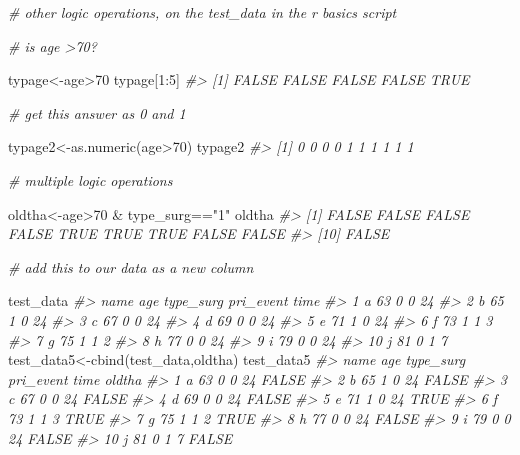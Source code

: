 \documentclass[
]{article}
\newenvironment{Shaded}{\begin{snugshade}}{\end{snugshade}}
\newcommand{\CommentTok}[1]{\textcolor[rgb]{0.56,0.35,0.01}{\textit{#1}}}
\newcommand{\DecValTok}[1]{\textcolor[rgb]{0.00,0.00,0.81}{#1}}
\newcommand{\FunctionTok}[1]{\textcolor[rgb]{0.00,0.00,0.00}{#1}}
\newcommand{\NormalTok}[1]{#1}
\newcommand{\OtherTok}[1]{\textcolor[rgb]{0.56,0.35,0.01}{#1}}
\newcommand{\SpecialCharTok}[1]{\textcolor[rgb]{0.00,0.00,0.00}{#1}}
\newcommand{\StringTok}[1]{\textcolor[rgb]{0.31,0.60,0.02}{#1}}
\begin{document}
\begin{Shaded}
\begin{Highlighting}[]
\CommentTok{\# other logic operations, on the test\_data in the r basics script}

\CommentTok{\# is age \textgreater{}70?}

\NormalTok{typage}\OtherTok{\textless{}{-}}\NormalTok{age}\SpecialCharTok{\textgreater{}}\DecValTok{70}
\NormalTok{typage[}\DecValTok{1}\SpecialCharTok{:}\DecValTok{5}\NormalTok{]}
\CommentTok{\#\textgreater{} [1] FALSE FALSE FALSE FALSE  TRUE}

\CommentTok{\# get this answer as 0 and 1}

\NormalTok{typage2}\OtherTok{\textless{}{-}}\FunctionTok{as.numeric}\NormalTok{(age}\SpecialCharTok{\textgreater{}}\DecValTok{70}\NormalTok{)}
\NormalTok{typage2  }
\CommentTok{\#\textgreater{}  [1] 0 0 0 0 1 1 1 1 1 1}

\CommentTok{\# multiple logic operations}

\NormalTok{oldtha}\OtherTok{\textless{}{-}}\NormalTok{age}\SpecialCharTok{\textgreater{}}\DecValTok{70} \SpecialCharTok{\&}\NormalTok{ type\_surg}\SpecialCharTok{==}\StringTok{"1"}
\NormalTok{oldtha}
\CommentTok{\#\textgreater{}  [1] FALSE FALSE FALSE FALSE  TRUE  TRUE  TRUE FALSE FALSE}
\CommentTok{\#\textgreater{} [10] FALSE}

\CommentTok{\# add this to our data as a new column}

\NormalTok{test\_data}
\CommentTok{\#\textgreater{}    name age type\_surg pri\_event time}
\CommentTok{\#\textgreater{} 1     a  63         0         0   24}
\CommentTok{\#\textgreater{} 2     b  65         1         0   24}
\CommentTok{\#\textgreater{} 3     c  67         0         0   24}
\CommentTok{\#\textgreater{} 4     d  69         0         0   24}
\CommentTok{\#\textgreater{} 5     e  71         1         0   24}
\CommentTok{\#\textgreater{} 6     f  73         1         1    3}
\CommentTok{\#\textgreater{} 7     g  75         1         1    2}
\CommentTok{\#\textgreater{} 8     h  77         0         0   24}
\CommentTok{\#\textgreater{} 9     i  79         0         0   24}
\CommentTok{\#\textgreater{} 10    j  81         0         1    7}
\NormalTok{test\_data5}\OtherTok{\textless{}{-}}\FunctionTok{cbind}\NormalTok{(test\_data,oldtha)}
\NormalTok{test\_data5}
\CommentTok{\#\textgreater{}    name age type\_surg pri\_event time oldtha}
\CommentTok{\#\textgreater{} 1     a  63         0         0   24  FALSE}
\CommentTok{\#\textgreater{} 2     b  65         1         0   24  FALSE}
\CommentTok{\#\textgreater{} 3     c  67         0         0   24  FALSE}
\CommentTok{\#\textgreater{} 4     d  69         0         0   24  FALSE}
\CommentTok{\#\textgreater{} 5     e  71         1         0   24   TRUE}
\CommentTok{\#\textgreater{} 6     f  73         1         1    3   TRUE}
\CommentTok{\#\textgreater{} 7     g  75         1         1    2   TRUE}
\CommentTok{\#\textgreater{} 8     h  77         0         0   24  FALSE}
\CommentTok{\#\textgreater{} 9     i  79         0         0   24  FALSE}
\CommentTok{\#\textgreater{} 10    j  81         0         1    7  FALSE}


\end{Highlighting}
\end{Shaded}
\end{document}

